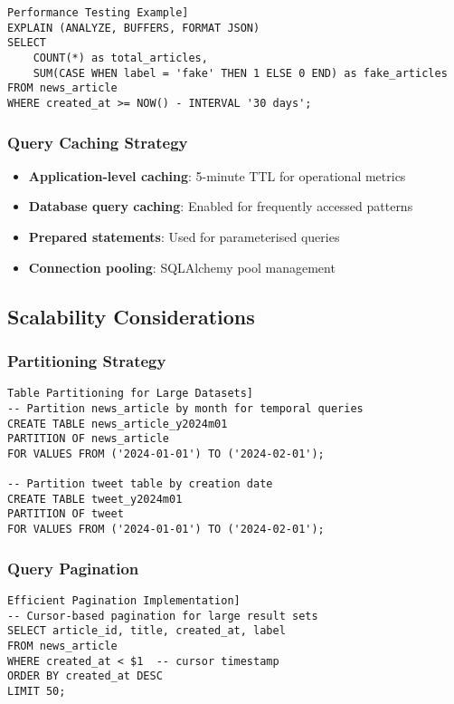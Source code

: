 \documentclass[11pt,a4paper]{article}
\begin{document}
\begin{verbatim}Performance Testing Example]
EXPLAIN (ANALYZE, BUFFERS, FORMAT JSON) 
SELECT 
    COUNT(*) as total_articles,
    SUM(CASE WHEN label = 'fake' THEN 1 ELSE 0 END) as fake_articles
FROM news_article
WHERE created_at >= NOW() - INTERVAL '30 days';
\end{verbatim}

\subsubsection{Query Caching Strategy}
\begin{itemize}
    \item \textbf{Application-level caching}: 5-minute TTL for operational metrics
    \item \textbf{Database query caching}: Enabled for frequently accessed patterns
    \item \textbf{Prepared statements}: Used for parameterised queries
    \item \textbf{Connection pooling}: SQLAlchemy pool management
\end{itemize}

\subsection{Scalability Considerations}

\subsubsection{Partitioning Strategy}
\begin{verbatim}Table Partitioning for Large Datasets]
-- Partition news_article by month for temporal queries
CREATE TABLE news_article_y2024m01 
PARTITION OF news_article 
FOR VALUES FROM ('2024-01-01') TO ('2024-02-01');

-- Partition tweet table by creation date
CREATE TABLE tweet_y2024m01 
PARTITION OF tweet 
FOR VALUES FROM ('2024-01-01') TO ('2024-02-01');
\end{verbatim}

\subsubsection{Query Pagination}
\begin{verbatim}Efficient Pagination Implementation]
-- Cursor-based pagination for large result sets
SELECT article_id, title, created_at, label
FROM news_article
WHERE created_at < $1  -- cursor timestamp
ORDER BY created_at DESC
LIMIT 50;
\end{verbatim}
\end{document}
